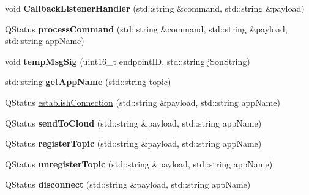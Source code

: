 \begin{DoxyCompactItemize}
\item 
void {\bfseries Callback\+Listener\+Handler} (std\+::string \&command, std\+::string \&payload)\hypertarget{classmqttBusObject_a0b42916c7a87370f96ec108f2f5a30c4}{}\label{classmqttBusObject_a0b42916c7a87370f96ec108f2f5a30c4}

\item 
Q\+Status {\bfseries process\+Command} (std\+::string \&command, std\+::string \&payload, std\+::string app\+Name)\hypertarget{classmqttBusObject_a57038365c7c109342152b8ffd45c276b}{}\label{classmqttBusObject_a57038365c7c109342152b8ffd45c276b}

\item 
void {\bfseries temp\+Msg\+Sig} (uint16\+\_\+t endpoint\+ID, std\+::string j\+Son\+String)\hypertarget{classmqttBusObject_aa75d9645ddf5f81d5e519a9a162efbd5}{}\label{classmqttBusObject_aa75d9645ddf5f81d5e519a9a162efbd5}

\item 
std\+::string {\bfseries get\+App\+Name} (std\+::string topic)\hypertarget{classmqttBusObject_a596f45afa4031365debb97ff3a15a791}{}\label{classmqttBusObject_a596f45afa4031365debb97ff3a15a791}

\item 
Q\+Status \hyperlink{classmqttBusObject_a5237defc339a71fd864c5067a714d91f}{establish\+Connection} (std\+::string \&payload, std\+::string app\+Name)
\item 
Q\+Status {\bfseries send\+To\+Cloud} (std\+::string \&payload, std\+::string app\+Name)\hypertarget{classmqttBusObject_a6fe208528046978aeb00d5723da4a934}{}\label{classmqttBusObject_a6fe208528046978aeb00d5723da4a934}

\item 
Q\+Status {\bfseries register\+Topic} (std\+::string \&payload, std\+::string app\+Name)\hypertarget{classmqttBusObject_a5fad3fb09b1b2bdc550c4a380023bff6}{}\label{classmqttBusObject_a5fad3fb09b1b2bdc550c4a380023bff6}

\item 
Q\+Status {\bfseries unregister\+Topic} (std\+::string \&payload, std\+::string app\+Name)\hypertarget{classmqttBusObject_ab5343123caac25a208443a2f385924d3}{}\label{classmqttBusObject_ab5343123caac25a208443a2f385924d3}

\item 
Q\+Status {\bfseries disconnect} (std\+::string \&payload, std\+::string app\+Name)\hypertarget{classmqttBusObject_a4528546ad08a4cd03e98e86e985c1b10}{}\label{classmqttBusObject_a4528546ad08a4cd03e98e86e985c1b10}


\end{DoxyCompactItemize}
